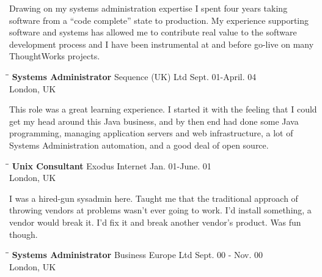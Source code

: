 \documentclass{res}
\begin{document}
\begin{resume}
	Drawing on my systems administration expertise I spent four years taking software from a ``code complete'' state to production.  My experience supporting software and systems has allowed me to contribute real value to the software development process and I have been instrumental at and before go-live on many ThoughtWorks projects.

	\begin{tabbing}
	   \hspace{2.3in}\= \hspace{2.6in}\= \kill %
	    {\bf Systems Administrator} \>Sequence (UK) Ltd \> Sept. 01-April. 04\\
	                          \>London, UK
	   \end{tabbing}\vspace{-20pt}
	This role was a great learning experience.  I started it with the feeling that I could get my head around this Java business, and by then end had done some Java programming, managing application servers and web infrastructure, a lot of Systems Administration automation, and a good deal of open source.

	\begin{tabbing}
	   \hspace{2.3in}\= \hspace{2.6in}\= \kill %
	    {\bf Unix Consultant} \>Exodus Internet \> Jan. 01-June. 01\\
	                          \>London, UK
	\end{tabbing}\vspace{-20pt}
	I was a hired-gun sysadmin here.  Taught me that the traditional approach of throwing vendors at problems wasn't ever going to work.  I'd install something, a vendor would break it.  I'd fix it and break another vendor's product.  Was fun though.
	
	\begin{tabbing}
	   \hspace{2.3in}\= \hspace{2.6in}\= \kill %
	    {\bf Systems Administrator} \>Business Europe Ltd \> Sept. 00 - Nov. 00\\
	                          \>London, UK
	\end{tabbing}\vspace{-20pt}
	

\end{resume}
\end{document}
